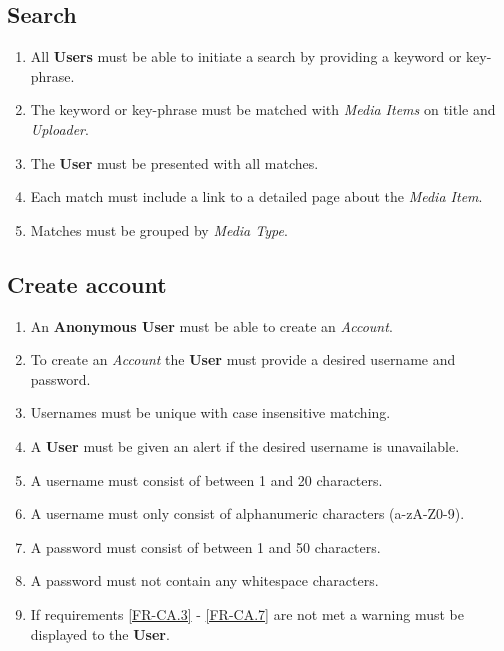 

%

\subsection {Search}

\begin{enumerate}[label=FR-\twodigits*]

	\item All \textbf{Users} must be able to initiate a search by providing a keyword or key-phrase.
	\item The keyword or key-phrase must be matched with \textit{Media Items} on title and \textit{Uploader}.
	\item The \textbf{User} must be presented with all matches.
	\item Each match must include a link to a detailed page about the \textit{Media Item}.
	\item Matches must be grouped by \textit{Media Type}. 
\end{enumerate}	
			
\subsection{Create account}

\begin{enumerate}[label=FR-\twodigits*, resume]
	\item An \textbf{Anonymous User} must be able to create an \textit{Account}.
	\item To create an \textit{Account} the \textbf{User} must provide a desired username and password.
	\item Usernames must be unique with case insensitive matching. \label{FR-CA.3}
	\item A \textbf{User} must be given an alert if the desired username is unavailable.
	\item A username must consist of between 1 and 20 characters.
	\item A username must only consist of alphanumeric characters (a-zA-Z0-9).
	\item A password must consist of between 1 and 50 characters. 
	\item A password must not contain any whitespace characters. \label{FR-CA.7}
	\item If requirements \ref{FR-CA.3} - \ref{FR-CA.7} are not met a warning must be displayed to the \textbf{User}.
\end{enumerate}
	
